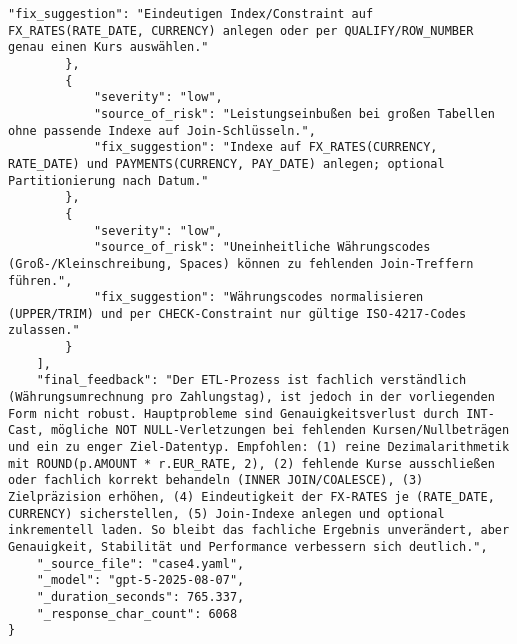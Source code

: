 \begin{lstlisting}[caption={Ausgabe: GPT-5 Anwendungsfall 4 Robustheitsdurchlauf},label={gpt_case4_prompt3}]
            "fix_suggestion": "Eindeutigen Index/Constraint auf FX_RATES(RATE_DATE, CURRENCY) anlegen oder per QUALIFY/ROW_NUMBER genau einen Kurs auswählen."
        },
        {
            "severity": "low",
            "source_of_risk": "Leistungseinbußen bei großen Tabellen ohne passende Indexe auf Join-Schlüsseln.",
            "fix_suggestion": "Indexe auf FX_RATES(CURRENCY, RATE_DATE) und PAYMENTS(CURRENCY, PAY_DATE) anlegen; optional Partitionierung nach Datum."
        },
        {
            "severity": "low",
            "source_of_risk": "Uneinheitliche Währungscodes (Groß-/Kleinschreibung, Spaces) können zu fehlenden Join-Treffern führen.",
            "fix_suggestion": "Währungscodes normalisieren (UPPER/TRIM) und per CHECK-Constraint nur gültige ISO-4217-Codes zulassen."
        }
    ],
    "final_feedback": "Der ETL-Prozess ist fachlich verständlich (Währungsumrechnung pro Zahlungstag), ist jedoch in der vorliegenden Form nicht robust. Hauptprobleme sind Genauigkeitsverlust durch INT-Cast, mögliche NOT NULL-Verletzungen bei fehlenden Kursen/Nullbeträgen und ein zu enger Ziel-Datentyp. Empfohlen: (1) reine Dezimalarithmetik mit ROUND(p.AMOUNT * r.EUR_RATE, 2), (2) fehlende Kurse ausschließen oder fachlich korrekt behandeln (INNER JOIN/COALESCE), (3) Zielpräzision erhöhen, (4) Eindeutigkeit der FX-RATES je (RATE_DATE, CURRENCY) sicherstellen, (5) Join-Indexe anlegen und optional inkrementell laden. So bleibt das fachliche Ergebnis unverändert, aber Genauigkeit, Stabilität und Performance verbessern sich deutlich.",
    "_source_file": "case4.yaml",
    "_model": "gpt-5-2025-08-07",
    "_duration_seconds": 765.337,
    "_response_char_count": 6068
}
\end{lstlisting}

